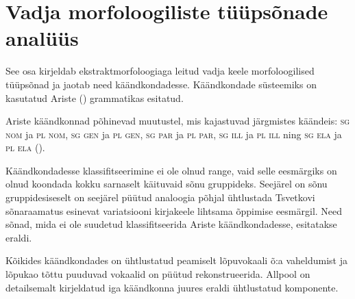 \documentclass[12pt,a4paper]{article}
\newcommand{\msd}[1]{\textsc{#1}}
\begin{document}




\newpage
\section{Vadja morfoloogiliste tüüpsõnade analüüs}
\label{sec:analüüs}

See osa kirjeldab ekstraktmorfoloogiaga leitud vadja keele morfoloogilised tüüpsõnad ja jaotab need käändkondadesse. Käändkondade süsteemiks on kasutatud Ariste (\citeyear{ariste_grammar_1968}) grammatikas esitatud.

Ariste käändkonnad põhinevad muutustel, mis kajastuvad järgmistes käändeis: \msd{sg nom} ja \msd{pl nom}, \msd{sg gen} ja \msd{pl gen}, \msd{sg par} ja \msd{pl par}, \msd{sg ill} ja \msd{pl ill} ning \msd{sg ela} ja \msd{pl ela} (\cite[42]{ariste_grammar_1968}).

Käändkondadesse klassifitseerimine ei ole olnud range, vaid selle eesmärgiks on olnud koondada kokku sarnaselt käituvaid sõnu gruppideks. Seejärel on sõnu gruppide\-siseselt on seejärel püütud analoogia põhjal ühtlustada Tsvetkovi sõnaraamatus esinevat variatsiooni kirjakeele lihtsama õppimise eesmärgil. Need sõnad, mida ei ole suudetud klassifitseerida Ariste käändkondadesse, esitatakse eraldi.



Kõikides käändkondades on ühtlustatud peamiselt lõpuvokaali õ:a vaheldumist ja lõpukao tõttu puuduvad vokaalid on püütud rekonstrueerida. Allpool on detailsemalt kirjeldatud iga käändkonna juures eraldi ühtlustatud komponente.
\end{document}
